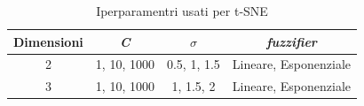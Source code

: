 \documentclass[12pt,italian]{report}
\begin{document}
\begin{table}[h!]
	\begin{center}
	
		\begin{tabular}{c|c|c|c}
			\toprule
			Dimensioni & \emph{C} & $ \sigma $ & \emph{fuzzifier}\\ \midrule
			2 & 1, 10, 1000 & 0.5, 1, 1.5 & Lineare, Esponenziale \\ 
			3 & 1, 10, 1000 & 1, 1.5, 2   & Lineare, Esponenziale  \\ 
			\bottomrule
		\end{tabular}
	\end{center}
	\caption{Iperparamentri usati per t-SNE}
	\label{tab:hyperparams_tsne}
\end{table}
\end{document}
